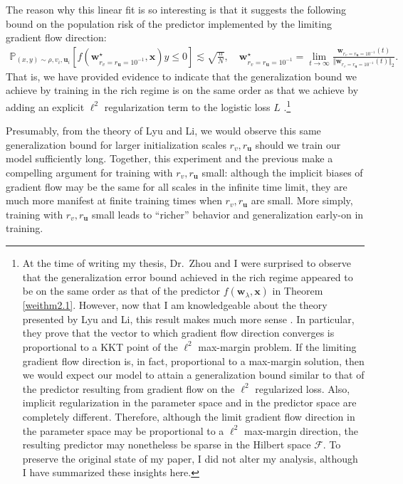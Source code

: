\documentclass{article}
\begin{document}
The reason why this linear fit is so interesting is that it suggests the following bound on the population risk of the predictor implemented by the limiting gradient flow direction:
\begin{align*}
   \mathbb{P}_{(x,y) \sim \rho, v_i, \boldsymbol{u}_i}[f(\boldsymbol{w}_{r_v = r_{\boldsymbol{u}} = 10^{-1}}^{\star}, \boldsymbol{x})y \leq 0] \lesssim \sqrt{\frac{n}{N}}, \quad \boldsymbol{w}_{r_v = r_{\boldsymbol{u}} = 10^{-1}}^{\star} = \lim_{t \to \infty} \frac{\boldsymbol{w}_{r_v = r_{\boldsymbol{u}} = 10^{-1}}(t)}{\Vert \boldsymbol{w}_{r_v = r_{\boldsymbol{u}} = 10^{-1}}(t) \Vert_2}.
\end{align*}
That is, we have provided evidence to indicate that the generalization bound we achieve by training in the rich regime is on the same order as that we achieve by adding an explicit $\ell^2$ regularization term to the logistic loss $L$ \cite{wei2019regularization}.\footnote{At the time of writing my thesis, Dr.~Zhou and I were surprised to observe that the generalization error bound achieved in the rich regime appeared to be on the same order as that of the predictor $f(\boldsymbol{w}_{\lambda}, \boldsymbol{x})$ in Theorem \ref{weithm2.1}. However, now that I am knowledgeable about the theory presented by Lyu and Li, this result makes much more sense \cite{lyu2019gradient}. In particular, they prove that the vector to which gradient flow direction converges is proportional to a KKT point of the $\ell^2$ max-margin problem. If the limiting gradient flow direction is, in fact, proportional to a max-margin solution, then we would expect our model to attain a generalization bound similar to that of the predictor resulting from gradient flow on the $\ell^2$ regularized loss. Also, implicit regularization in the parameter space and in the predictor space are completely different. Therefore, although the limit gradient flow direction in the parameter space may be proportional to a $\ell^2$ max-margin direction, the resulting predictor may nonetheless be sparse in the Hilbert space $\mathcal{F}$. To preserve the original state of my paper, I did not alter my analysis, although I have summarized these insights here.} 

Presumably, from the theory of Lyu and Li, we would observe this same generalization bound for larger initialization scales $r_v, r_{\boldsymbol{u}}$ should we train our model sufficiently long. Together, this experiment and the previous make a compelling argument for training with $r_v, r_{\boldsymbol{u}}$ small: although the implicit biases of gradient flow may be the same for all scales in the infinite time limit, they are much more manifest at finite training times when $r_v, r_{\boldsymbol{u}}$ are small. More simply, training with $r_v, r_{\boldsymbol{u}}$ small leads to \enquote{richer} behavior and generalization early-on in training. 
\end{document}
